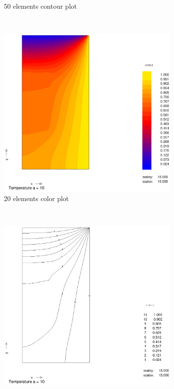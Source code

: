 \documentclass[10pt,a4paper]{article}
\begin{document}
\begin{figure}[h]
\begin{subfigure}[b]{0.45\textwidth}
                \caption{50 elements contour plot}
                \label{fig:col_a10_50el}
        \end{subfigure}      
        ~
        \begin{subfigure}[b]{0.45\textwidth}
                \includegraphics[width=\textwidth]{colplot_a10_50el}
                \caption{20 elements color plot}
                \label{fig:colplot_a10_50el}
        \end{subfigure}
        ~
        \begin{subfigure}[b]{0.45\textwidth}
                \includegraphics[width=\textwidth]{cont_a10_99el}

\end{subfigure}
\end{figure}
\end{document}

